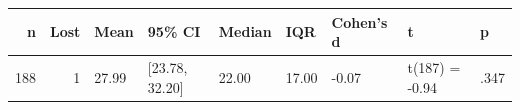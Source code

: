 \begin{tabular}{rrlllllll}
  \toprule
n & Lost & Mean & 95\% CI & Median & IQR & Cohen's d & t & p \\ 
  \midrule
188 &   1 & 27.99 & [23.78, 32.20] & 22.00 & 17.00 & -0.07 & t(187) = -0.94 & .347 \\ 
   \bottomrule
\end{tabular}
